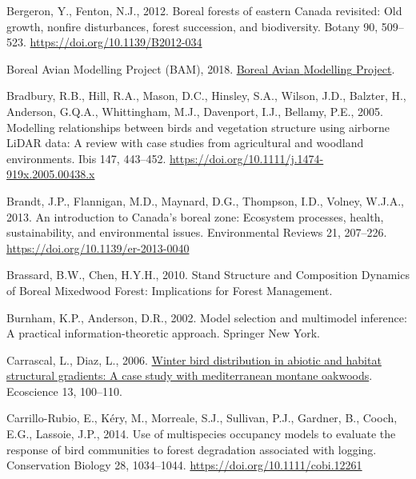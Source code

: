 \documentclass[
]{article}
\newlength{\cslhangindent}
\newlength{\cslentryspacingunit} %
\newenvironment{CSLReferences}[2] %
 {%
  \setlength{\parindent}{0pt}
  \ifodd #1
  \let\oldpar\par
  \def\par{\hangindent=\cslhangindent\oldpar}
  \fi
  \setlength{\parskip}{#2\cslentryspacingunit}
 }%
 {}
\begin{document}
\begin{CSLReferences}{1}{0}
\leavevmode{}%
Bergeron, Y., Fenton, N.J., 2012. Boreal forests of eastern {Canada} revisited: {Old} growth, nonfire disturbances, forest succession, and biodiversity. Botany 90, 509--523. \url{https://doi.org/10.1139/B2012-034}

\leavevmode{}%
Boreal Avian Modelling Project (BAM), 2018. \href{http://www.borealbirds.ca/}{Boreal {Avian} {Modelling} {Project}}.

\leavevmode{}%
Bradbury, R.B., Hill, R.A., Mason, D.C., Hinsley, S.A., Wilson, J.D., Balzter, H., Anderson, G.Q.A., Whittingham, M.J., Davenport, I.J., Bellamy, P.E., 2005. Modelling relationships between birds and vegetation structure using airborne {LiDAR} data: A review with case studies from agricultural and woodland environments. Ibis 147, 443--452. \url{https://doi.org/10.1111/j.1474-919x.2005.00438.x}

\leavevmode{}%
Brandt, J.P., Flannigan, M.D., Maynard, D.G., Thompson, I.D., Volney, W.J.A., 2013. An introduction to {Canada}'s boreal zone: {Ecosystem} processes, health, sustainability, and environmental issues. Environmental Reviews 21, 207--226. \url{https://doi.org/10.1139/er-2013-0040}

\leavevmode{}%
Brassard, B.W., Chen, H.Y.H., 2010. Stand {Structure} and {Composition} {Dynamics} of {Boreal} {Mixedwood} {Forest}: {Implications} for {Forest} {Management}.

\leavevmode{}%
Burnham, K.P., Anderson, D.R., 2002. Model selection and multimodel inference: {A} practical information-theoretic approach. Springer New York.

\leavevmode{}%
Carrascal, L., Diaz, L., 2006. \href{https://www.tandfonline.com/doi/abs/10.2980/1195-6860(2006)13\%5B100\%3AWBDIAA\%5D2.0.CO\%3B2}{Winter bird distribution in abiotic and habitat structural gradients: A case study with mediterranean montane oakwoods}. Ecoscience 13, 100--110.

\leavevmode{}%
Carrillo-Rubio, E., Kéry, M., Morreale, S.J., Sullivan, P.J., Gardner, B., Cooch, E.G., Lassoie, J.P., 2014. Use of multispecies occupancy models to evaluate the response of bird communities to forest degradation associated with logging. Conservation Biology 28, 1034--1044. \url{https://doi.org/10.1111/cobi.12261}


\end{CSLReferences}
\end{document}
